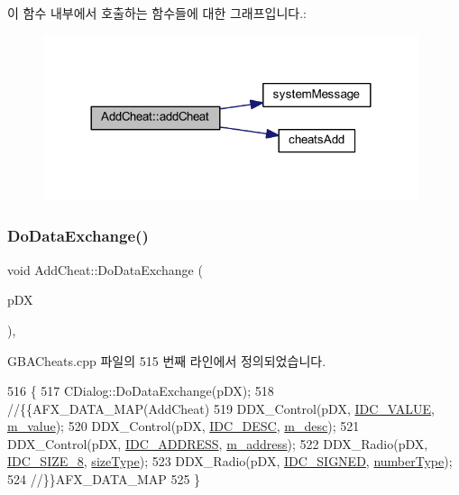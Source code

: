 이 함수 내부에서 호출하는 함수들에 대한 그래프입니다.\+:
\nopagebreak
\begin{figure}[H]
\begin{center}
\leavevmode
\includegraphics[width=312pt]{class_add_cheat_a53989b2f3f179185384d258c9e71ace7_cgraph}
\end{center}
\end{figure}
\mbox{\label{class_add_cheat_a9d3dbf5955873700caf71f41fa5117cc}} 
\subsubsection{\texorpdfstring{Do\+Data\+Exchange()}{DoDataExchange()}}
{\footnotesize\ttfamily void Add\+Cheat\+::\+Do\+Data\+Exchange (\begin{DoxyParamCaption}\item[{C\+Data\+Exchange $\ast$}]{p\+DX }\end{DoxyParamCaption})\hspace{0.3cm}{\ttfamily [protected]}, {\ttfamily [virtual]}}



G\+B\+A\+Cheats.\+cpp 파일의 515 번째 라인에서 정의되었습니다.


\begin{DoxyCode}
516 \{
517   CDialog::DoDataExchange(pDX);
518   \textcolor{comment}{//\{\{AFX\_DATA\_MAP(AddCheat)}
519   DDX\_Control(pDX, \mbox{\hyperlink{resource_8h_aa862eefddc803e8e65c3253b8029314f}{IDC\_VALUE}}, \mbox{\hyperlink{class_add_cheat_aff9c3fd61a088f03dba1eb01e6956286}{m\_value}});
520   DDX\_Control(pDX, \mbox{\hyperlink{resource_8h_adb05cf1e74135587a9b3ab93a5152feb}{IDC\_DESC}}, \mbox{\hyperlink{class_add_cheat_a644f29b6dd8a0d26d5050054bdf2b054}{m\_desc}});
521   DDX\_Control(pDX, \mbox{\hyperlink{resource_8h_af0726d27cf7b7070867a81fde283a218}{IDC\_ADDRESS}}, \mbox{\hyperlink{class_add_cheat_a27ec0f498f3827cfc81c19d963c7fef5}{m\_address}});
522   DDX\_Radio(pDX, \mbox{\hyperlink{resource_8h_aabec7e8ec4648288db9ff8c10fdf3bb7}{IDC\_SIZE\_8}}, \mbox{\hyperlink{class_add_cheat_a7c3af367e51b1812d951dd2d24ac1aa8}{sizeType}});
523   DDX\_Radio(pDX, \mbox{\hyperlink{resource_8h_ae13e01a62e7c40be0e3a93d98d2cd1d3}{IDC\_SIGNED}}, \mbox{\hyperlink{class_add_cheat_a50115e7ad42a106db574754cc81bc9a0}{numberType}});
524   \textcolor{comment}{//\}\}AFX\_DATA\_MAP}
525 \}
\end{DoxyCode}
\mbox{\label{class_add_cheat_aef14a7fa535621c242e9007a7c0510e7}} 
